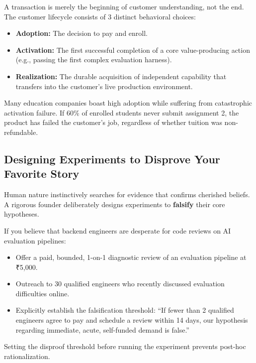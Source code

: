 A transaction is merely the beginning of customer understanding, not the end. The customer lifecycle consists of 3 distinct behavioral choices:
\begin{itemize}[leftmargin=1.2em,itemsep=0.2ex]
  \item \textbf{Adoption:} The decision to pay and enroll.
  \item \textbf{Activation:} The first successful completion of a core value-producing action (e.g., passing the first complex evaluation harness).
  \item \textbf{Realization:} The durable acquisition of independent capability that transfers into the customer's live production environment.
\end{itemize}
Many education companies boast high adoption while suffering from catastrophic activation failure. If 60\% of enrolled students never submit assignment 2, the product has failed the customer's job, regardless of whether tuition was non-refundable.

\subsection{Designing Experiments to Disprove Your Favorite Story}

Human nature instinctively searches for evidence that confirms cherished beliefs. A rigorous founder deliberately designs experiments to \textbf{falsify} their core hypotheses.

If you believe that backend engineers are desperate for code reviews on AI evaluation pipelines:
\begin{itemize}[leftmargin=1.2em,itemsep=0.2ex]
  \item Offer a paid, bounded, 1-on-1 diagnostic review of an evaluation pipeline at ₹5,000.
  \item Outreach to 30 qualified engineers who recently discussed evaluation difficulties online.
  \item Explicitly establish the falsification threshold: ``If fewer than 2 qualified engineers agree to pay and schedule a review within 14 days, our hypothesis regarding immediate, acute, self-funded demand is false.''
\end{itemize}
Setting the disproof threshold before running the experiment prevents post-hoc rationalization.
